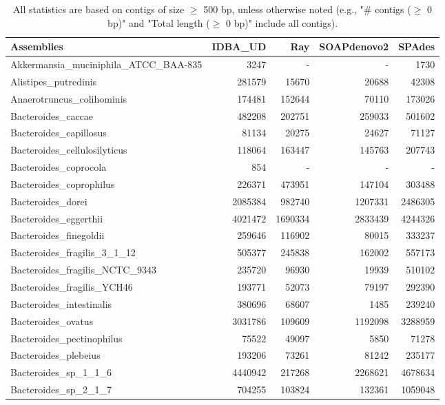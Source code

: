 \documentclass[12pt,a4paper]{article}
\begin{document}
\begin{table}[ht]
\begin{center}
\caption{All statistics are based on contigs of size $\geq$ 500 bp, unless otherwise noted (e.g., "\# contigs ($\geq$ 0 bp)" and "Total length ($\geq$ 0 bp)" include all contigs).}
\begin{tabular}{|l*{4}{|r}|}
\hline
Assemblies & IDBA\_UD & Ray & SOAPdenovo2 & SPAdes \\ \hline
Akkermansia\_muciniphila\_ATCC\_BAA-835 & 3247 & - & - & 1730 \\ \hline
Alistipes\_putredinis & 281579 & 15670 & 20688 & 42308 \\ \hline
Anaerotruncus\_colihominis & 174481 & 152644 & 70110 & 173026 \\ \hline
Bacteroides\_caccae & 482208 & 202751 & 259033 & 501602 \\ \hline
Bacteroides\_capillosus & 81134 & 20275 & 24627 & 71127 \\ \hline
Bacteroides\_cellulosilyticus & 118064 & 163447 & 145763 & 207743 \\ \hline
Bacteroides\_coprocola & 854 & - & - & - \\ \hline
Bacteroides\_coprophilus & 226371 & 473951 & 147104 & 303488 \\ \hline
Bacteroides\_dorei & 2085384 & 982740 & 1207331 & 2486305 \\ \hline
Bacteroides\_eggerthii & 4021472 & 1690334 & 2833439 & 4244326 \\ \hline
Bacteroides\_finegoldii & 259646 & 116902 & 80015 & 333237 \\ \hline
Bacteroides\_fragilis\_3\_1\_12 & 505377 & 245838 & 162002 & 557173 \\ \hline
Bacteroides\_fragilis\_NCTC\_9343 & 235720 & 96930 & 19939 & 510102 \\ \hline
Bacteroides\_fragilis\_YCH46 & 193771 & 52073 & 79197 & 292390 \\ \hline
Bacteroides\_intestinalis & 380696 & 68607 & 1485 & 239240 \\ \hline
Bacteroides\_ovatus & 3031786 & 109609 & 1192098 & 3288959 \\ \hline
Bacteroides\_pectinophilus & 75522 & 49097 & 5850 & 71278 \\ \hline
Bacteroides\_plebeius & 193206 & 73261 & 81242 & 235177 \\ \hline
Bacteroides\_sp\_1\_1\_6 & 4440942 & 217268 & 2268621 & 4678634 \\ \hline
Bacteroides\_sp\_2\_1\_7 & 704255 & 103824 & 132361 & 1059048 \\ \hline

\end{tabular}
\end{center}
\end{table}
\end{document}
